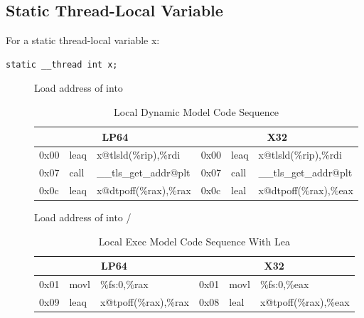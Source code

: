 \begin{description}
\end{description}

\subsection{Static Thread-Local Variable}

For a static thread-local variable x:

\begin{verbatim}
static __thread int x;
\end{verbatim}

\begin{description}
\item[]
  Load address of  into 

\begin{table}[H]
\Hrule
\caption{Local Dynamic Model Code Sequence}
\begin{center}
\code\small{
\begin{tabular}{lll|lll}
\multicolumn{3}{c}{LP64} & \multicolumn{3}{c}{X32} \\
\hline
0x00 & leaq  & x@tlsld(\%rip),\%rdi	& 0x00 & leaq & x@tlsld(\%rip),\%rdi\\
0x07 & call  & \_\_tls\_get\_addr@plt	& 0x07 & call & \_\_tls\_get\_addr@plt\\
0x0c & leaq  & x@dtpoff(\%rax),\%rax	& 0x0c & leal & x@dtpoff(\%rax),\%eax\\
\end{tabular}
}
\end{center}
\Hrule
\end{table}

\item[]
  Load address of  into /

\begin{table}[H]
\Hrule
\caption{Local Exec Model Code Sequence With Lea}
\begin{center}
\code\small{
\begin{tabular}{lll|lll}
\multicolumn{3}{c}{LP64} & \multicolumn{3}{c}{X32} \\
\hline
0x01 & movl & \%fs:0,\%rax		& 0x01 & movl & \%fs:0,\%eax \\
0x09 & leaq & x@tpoff(\%rax),\%rax	& 0x08 & leal & x@tpoff(\%rax),\%eax \\
\end{tabular}
}
\end{center}
\Hrule
\end{table}


\end{description}
